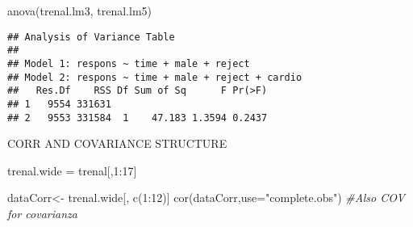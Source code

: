 \documentclass[
]{article}
\newenvironment{Shaded}{\begin{snugshade}}{\end{snugshade}}
\newcommand{\AttributeTok}[1]{\textcolor[rgb]{0.77,0.63,0.00}{#1}}
\newcommand{\CommentTok}[1]{\textcolor[rgb]{0.56,0.35,0.01}{\textit{#1}}}
\newcommand{\DecValTok}[1]{\textcolor[rgb]{0.00,0.00,0.81}{#1}}
\newcommand{\FunctionTok}[1]{\textcolor[rgb]{0.00,0.00,0.00}{#1}}
\newcommand{\NormalTok}[1]{#1}
\newcommand{\OtherTok}[1]{\textcolor[rgb]{0.56,0.35,0.01}{#1}}
\newcommand{\SpecialCharTok}[1]{\textcolor[rgb]{0.00,0.00,0.00}{#1}}
\newcommand{\StringTok}[1]{\textcolor[rgb]{0.31,0.60,0.02}{#1}}
\begin{document}
\begin{Shaded}
\begin{Highlighting}[]
\FunctionTok{anova}\NormalTok{(trenal.lm3, trenal.lm5)}
\end{Highlighting}
\end{Shaded}

\begin{verbatim}
## Analysis of Variance Table
## 
## Model 1: respons ~ time + male + reject
## Model 2: respons ~ time + male + reject + cardio
##   Res.Df    RSS Df Sum of Sq      F Pr(>F)
## 1   9554 331631                           
## 2   9553 331584  1    47.183 1.3594 0.2437
\end{verbatim}

CORR AND COVARIANCE STRUCTURE

\begin{Shaded}
\begin{Highlighting}[]
\NormalTok{trenal.wide }\OtherTok{=}\NormalTok{ trenal[,}\DecValTok{1}\SpecialCharTok{:}\DecValTok{17}\NormalTok{]}

\NormalTok{dataCorr}\OtherTok{\textless{}{-}}\NormalTok{ trenal.wide[, }\FunctionTok{c}\NormalTok{(}\DecValTok{1}\SpecialCharTok{:}\DecValTok{12}\NormalTok{)]}
\FunctionTok{cor}\NormalTok{(dataCorr,}\AttributeTok{use=}\StringTok{"complete.obs"}\NormalTok{) }\CommentTok{\#Also COV for covarianza}
\end{Highlighting}
\end{Shaded}
\end{document}
